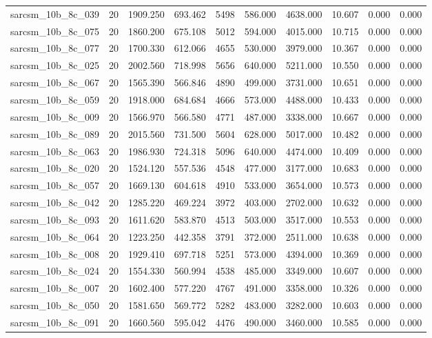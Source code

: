 \begin{tabular}{lrrrrrrrrr}
sarcsm\_10b\_8c\_039 & 20 & 1909.250 & 693.462 & 5498 & 586.000 & 4638.000 & 10.607 & 0.000 & 0.000 \\
sarcsm\_10b\_8c\_075 & 20 & 1860.200 & 675.108 & 5012 & 594.000 & 4015.000 & 10.715 & 0.000 & 0.000 \\
sarcsm\_10b\_8c\_077 & 20 & 1700.330 & 612.066 & 4655 & 530.000 & 3979.000 & 10.367 & 0.000 & 0.000 \\
sarcsm\_10b\_8c\_025 & 20 & 2002.560 & 718.998 & 5656 & 640.000 & 5211.000 & 10.550 & 0.000 & 0.000 \\
sarcsm\_10b\_8c\_067 & 20 & 1565.390 & 566.846 & 4890 & 499.000 & 3731.000 & 10.651 & 0.000 & 0.000 \\
sarcsm\_10b\_8c\_059 & 20 & 1918.000 & 684.684 & 4666 & 573.000 & 4488.000 & 10.433 & 0.000 & 0.000 \\
sarcsm\_10b\_8c\_009 & 20 & 1566.970 & 566.580 & 4771 & 487.000 & 3338.000 & 10.667 & 0.000 & 0.000 \\
sarcsm\_10b\_8c\_089 & 20 & 2015.560 & 731.500 & 5604 & 628.000 & 5017.000 & 10.482 & 0.000 & 0.000 \\
sarcsm\_10b\_8c\_063 & 20 & 1986.930 & 724.318 & 5096 & 640.000 & 4474.000 & 10.409 & 0.000 & 0.000 \\
sarcsm\_10b\_8c\_020 & 20 & 1524.120 & 557.536 & 4548 & 477.000 & 3177.000 & 10.683 & 0.000 & 0.000 \\
sarcsm\_10b\_8c\_057 & 20 & 1669.130 & 604.618 & 4910 & 533.000 & 3654.000 & 10.573 & 0.000 & 0.000 \\
sarcsm\_10b\_8c\_042 & 20 & 1285.220 & 469.224 & 3972 & 403.000 & 2702.000 & 10.632 & 0.000 & 0.000 \\
sarcsm\_10b\_8c\_093 & 20 & 1611.620 & 583.870 & 4513 & 503.000 & 3517.000 & 10.553 & 0.000 & 0.000 \\
sarcsm\_10b\_8c\_064 & 20 & 1223.250 & 442.358 & 3791 & 372.000 & 2511.000 & 10.638 & 0.000 & 0.000 \\
sarcsm\_10b\_8c\_008 & 20 & 1929.410 & 697.718 & 5251 & 573.000 & 4394.000 & 10.369 & 0.000 & 0.000 \\
sarcsm\_10b\_8c\_024 & 20 & 1554.330 & 560.994 & 4538 & 485.000 & 3349.000 & 10.607 & 0.000 & 0.000 \\
sarcsm\_10b\_8c\_007 & 20 & 1602.400 & 577.220 & 4767 & 491.000 & 3358.000 & 10.326 & 0.000 & 0.000 \\
sarcsm\_10b\_8c\_050 & 20 & 1581.650 & 569.772 & 5282 & 483.000 & 3282.000 & 10.603 & 0.000 & 0.000 \\
sarcsm\_10b\_8c\_091 & 20 & 1660.560 & 595.042 & 4476 & 490.000 & 3460.000 & 10.585 & 0.000 & 0.000 \\

\end{tabular}
